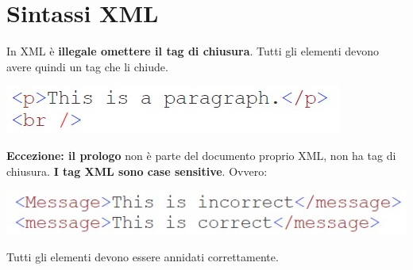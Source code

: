 \section{Sintassi XML} 
In XML è \textbf{illegale omettere il tag di chiusura}. Tutti gli elementi devono avere quindi un tag che li chiude. 
\begin{center}
    \includegraphics[scale=0.4]{Images/TecnologieWeb/5/Paragrafo.jpg}
\end{center}
\textbf{Eccezione: il prologo} non è parte del documento proprio XML, non ha tag di chiusura. \textbf{I tag XML sono case sensitive}. Ovvero:
\begin{center}
    \includegraphics[scale=0.4]{Images/TecnologieWeb/5/Message.jpg}
\end{center}
Tutti gli elementi devono essere annidati correttamente. 

